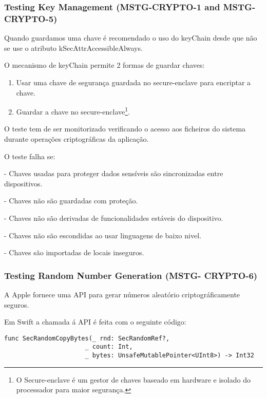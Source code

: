 \subsubsection{Testing Key Management (MSTG-CRYPTO-1 and MSTG-CRYPTO-5)}
\hfill\par
\hfill\par
Quando guardamos uma chave é recomendado o uso do keyChain desde que não se use o atributo kSecAttrAccessibleAlways.

O mecanismo de keyChain permite 2 formas de guardar chaves:
\begin{enumerate}
	\item Usar uma chave de segurança guardada no secure-enclave para encriptar a chave.

	\item Guardar a chave no secure-enclave\footnote[4]{ O Secure-enclave é um gestor de chaves baseado em hardware e isolado do processador para maior segurança\cite{book}.}.
\end{enumerate}



O teste tem de ser monitorizado verificando o acesso aos ficheiros do sistema durante operações criptográficas da aplicação.

O teste falha se:

	- Chaves usadas para proteger dados sensíveis são sincronizadas entre dispositivos.

	- Chaves não são guardadas com proteção.

	- Chaves não são derivadas de funcionalidades estáveis do dispositivo.

	- Chaves não são escondidas ao usar linguagens de baixo nivel.

	- Chaves são importadas de locais inseguros.




\subsubsection{Testing Random Number Generation (MSTG- CRYPTO-6)}
\hfill\par
\hfill\par

A Apple fornece uma API para gerar números aleatório criptográficamente seguros.

Em Swift a chamada á API é feita com o seguinte código:

\begin{lstlisting}[basicstyle=\small,]
    func SecRandomCopyBytes(_ rnd: SecRandomRef?,
                      _ count: Int,
                      _ bytes: UnsafeMutablePointer<UInt8>) -> Int32
\end{lstlisting}

